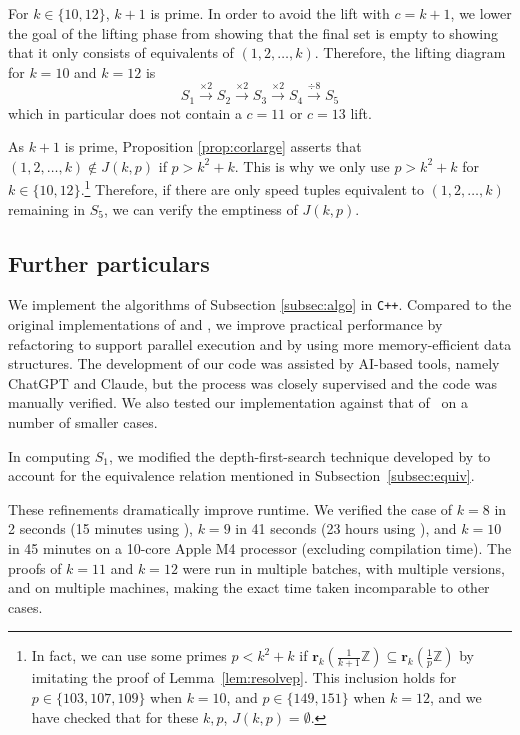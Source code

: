 \documentclass[11pt]{amsart}
\newcommand{\Z}{\mathbb{Z}}
\newcommand{\rbf}{\mathbf{r}}
\newcommand{\onetok}{(1, 2, \dots, k)}
\theoremstyle{definition}
\theoremstyle{remark}
\begin{document}
For $k\in\{10,12\}$, $k+1$ is prime. 
In order to avoid the lift with $c=k+1$, we lower the goal of the lifting phase from showing that the final set is empty 
to showing that it only consists of equivalents of $\onetok$.
Therefore, the lifting diagram for $k = 10$ and $k=12$ is 
\[ S_1\xrightarrow{\times 2}S_2\xrightarrow{\times 2}S_3\xrightarrow{\times 2}S_4\xrightarrow{\div 8}S_5 \] 
which in particular does not contain a $c=11$ or $c=13$ lift.

As $k+1$ is prime, Proposition \ref{prop:corlarge} asserts that $\onetok\notin J(k,p)$ if $p>k^2+k$.
This is why we only use $p>k^2+k$ for $k\in\{10,12\}$.\footnote{
  In fact, we can use some primes $p<k^2+k$ if $\rbf_k(\frac{1}{k+1}\Z)\subseteq\rbf_k(\frac{1}{p}\Z)$ 
  by imitating the proof of Lemma~\ref{lem:resolvep}.
  This inclusion holds for $p \in \{103, 107, 109\}$ when $k=10$, and $p \in \{149,151\}$ when $k=12$,
  and we have checked that for these $k,p$, $J(k,p)=\emptyset$.
} Therefore, if there are only speed tuples equivalent to $\onetok$ remaining in $S_5$, we can verify the emptiness of $J(k,p)$.

\subsection{Further particulars}
We implement the algorithms of Subsection \ref{subsec:algo} in \texttt{C++}. %
Compared to the original implementations of \cite{rosenfeldcode} and \cite{tanupatcode},
we improve practical performance by refactoring to support parallel execution and by using more memory-efficient data structures.
The development of our code was assisted by AI-based tools, namely ChatGPT and Claude, but the process was closely supervised and the code was manually verified.
We also tested our implementation against that of~\cite{tanupatcode} on a number of smaller cases.

In computing $S_1$, we modified the depth-first-search technique developed by \cite{rosenfeldcode} to account for the equivalence relation
mentioned in Subsection~\ref{subsec:equiv}.

These refinements dramatically improve runtime. We verified the case of $k=8$ in 2 seconds (15 minutes using \cite{tanupatcode}), 
$k=9$ in 41 seconds (23 hours using \cite{tanupatcode}), and $k=10$ in 45 minutes on a 10-core Apple M4 processor
(excluding compilation time). 
The proofs of $k=11$ and $k=12$ were run in multiple batches, with multiple versions, 
and on multiple machines, making the exact time taken incomparable to other cases. 
\end{document}

